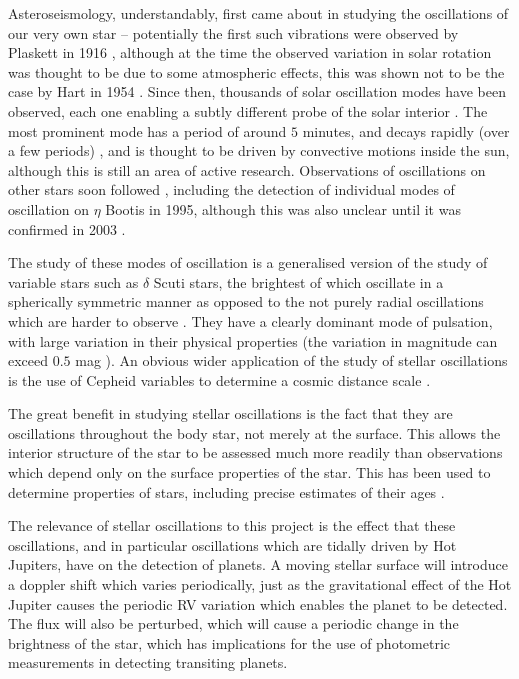 \documentclass[11pt]{amsart}
\begin{document}
Asteroseismology, understandably, first came about in studying the oscillations of our very own star -- potentially the first such vibrations were observed by Plaskett in 1916 \cite{Plaskett1916}, although at the time the observed variation in solar rotation was thought to be due to some atmospheric effects, this was shown not to be the case by Hart in 1954 \cite{Hart1954}.  Since then, thousands of solar oscillation modes have been observed, each one enabling a subtly different probe of the solar interior \cite{DiMauro2017}.  The most prominent mode has a period of around $5$ minutes, and decays rapidly (over a few periods) \cite{Ulrich1970},  and is thought to be driven by convective motions inside the sun, although this is still an area of active research.  Observations of oscillations on other stars soon followed \cite{Brown1991}, including the detection of individual modes of oscillation on $\eta$ Bootis in 1995, although this was also unclear until it was confirmed in 2003 \cite{Kjeldsen2003}.

The study of these modes of oscillation is a generalised version of the study of variable stars such as $\delta$ Scuti stars, the brightest of which oscillate in a spherically symmetric manner as opposed to the not purely radial oscillations which are harder to observe \cite{Garg2010}.  They have a clearly dominant mode of pulsation, with large variation in their physical properties (the variation in magnitude can exceed $0.5$ mag \cite{Garg2010}).  An obvious wider application of the study of stellar oscillations is the use of Cepheid variables to determine a cosmic distance scale \cite{Madore1991}.

The great benefit in studying stellar oscillations is the fact that they are oscillations throughout the body star, not merely at the surface.  This allows the interior structure of the star to be assessed much more readily than observations which depend only on the surface properties of the star.  This has been used to determine properties of stars, including precise estimates of their ages \cite{Chaplin2013} \cite{Cunha2007}.

The relevance of stellar oscillations to this project is the effect that these oscillations, and in particular oscillations which are tidally driven by Hot Jupiters, have on the detection of planets.  A moving stellar surface will introduce a doppler shift which varies periodically, just as the gravitational effect of the Hot Jupiter causes the periodic RV variation which enables the planet to be detected.  The flux will also be perturbed, which will cause a periodic change in the brightness of the star, which has implications for the use of photometric measurements in detecting transiting planets.
\end{document}
